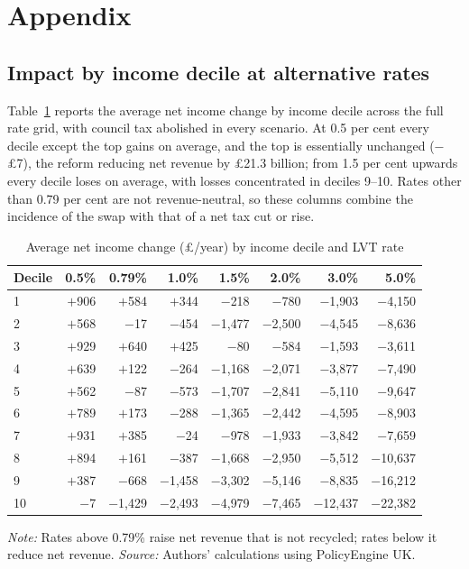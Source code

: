 \appendix
\section{Appendix}
\label{sec:appendix}

\subsection{Impact by income decile at alternative rates}

Table~\ref{tab:rategrid} reports the average net income change by income decile across the full rate grid, with council tax abolished in every scenario. At 0.5 per cent every decile except the top gains on average, and the top is essentially unchanged ($-$\pounds 7), the reform reducing net revenue by \pounds 21.3 billion; from 1.5 per cent upwards every decile loses on average, with losses concentrated in deciles 9--10. Rates other than 0.79 per cent are not revenue-neutral, so these columns combine the incidence of the swap with that of a net tax cut or rise.

\begin{table}[htbp]
\centering
\caption{Average net income change (\pounds/year) by income decile and LVT rate}
\label{tab:rategrid}
\begin{tabular}{lrrrrrrr}
\toprule
Decile & 0.5\% & 0.79\% & 1.0\% & 1.5\% & 2.0\% & 3.0\% & 5.0\% \\
\midrule
1  & $+$906     & $+$584     & $+$344     & $-$218     & $-$780     & $-$1{,}903  & $-$4{,}150 \\
2  & $+$568     & $-$17      & $-$454     & $-$1{,}477 & $-$2{,}500 & $-$4{,}545  & $-$8{,}636 \\
3  & $+$929     & $+$640     & $+$425     & $-$80      & $-$584     & $-$1{,}593  & $-$3{,}611 \\
4  & $+$639     & $+$122     & $-$264     & $-$1{,}168 & $-$2{,}071 & $-$3{,}877  & $-$7{,}490 \\
5  & $+$562     & $-$87      & $-$573     & $-$1{,}707 & $-$2{,}841 & $-$5{,}110  & $-$9{,}647 \\
6  & $+$789     & $+$173     & $-$288     & $-$1{,}365 & $-$2{,}442 & $-$4{,}595  & $-$8{,}903 \\
7  & $+$931     & $+$385     & $-$24      & $-$978     & $-$1{,}933 & $-$3{,}842  & $-$7{,}659 \\
8  & $+$894     & $+$161     & $-$387     & $-$1{,}668 & $-$2{,}950 & $-$5{,}512  & $-$10{,}637 \\
9  & $+$387     & $-$668     & $-$1{,}458 & $-$3{,}302 & $-$5{,}146 & $-$8{,}835  & $-$16{,}212 \\
10 & $-$7       & $-$1{,}429 & $-$2{,}493 & $-$4{,}979 & $-$7{,}465 & $-$12{,}437 & $-$22{,}382 \\
\bottomrule
\end{tabular}

\medskip
{\footnotesize\emph{Note:} Rates above 0.79\% raise net revenue that is not recycled; rates below it reduce net revenue. \emph{Source:} Authors' calculations using PolicyEngine UK.}
\end{table}

